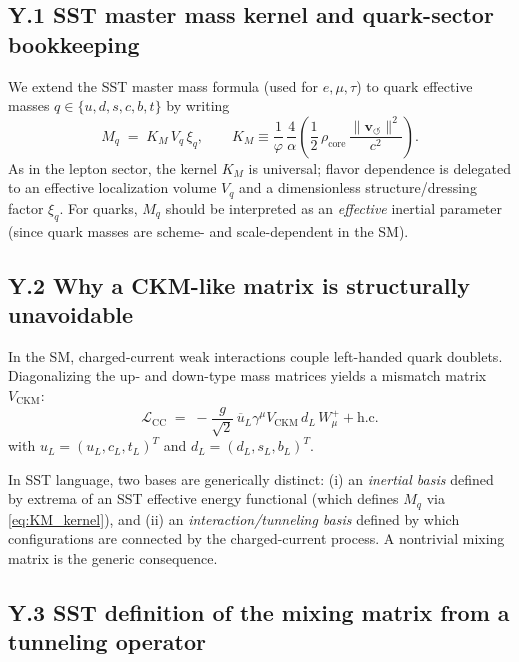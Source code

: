 \documentclass[10pt]{article}
\begin{document}
    \subsection*{Y.1 SST master mass kernel and quark-sector bookkeeping}

        We extend the SST master mass formula (used for $e,\mu,\tau$) to quark effective masses
        $q\in\{u,d,s,c,b,t\}$ by writing
        \begin{equation}
            M_q \;=\; K_M\,V_q\,\xi_q,
            \qquad
            K_M \equiv \frac{1}{\varphi}\,\frac{4}{\alpha}\left(\frac12\,\rho_{\text{core}}\,\frac{\lVert \mathbf{v}_{\!\boldsymbol{\circlearrowleft}}\rVert^2}{c^2}\right).
            \label{eq:KM_kernel}
        \end{equation}
        As in the lepton sector, the kernel $K_M$ is universal; flavor dependence is delegated to
        an effective localization volume $V_q$ and a dimensionless structure/dressing factor $\xi_q$.
        For quarks, $M_q$ should be interpreted as an \emph{effective} inertial parameter (since quark masses
        are scheme- and scale-dependent in the SM).

    \subsection*{Y.2 Why a CKM-like matrix is structurally unavoidable}

        In the SM, charged-current weak interactions couple left-handed quark doublets.
        Diagonalizing the up- and down-type mass matrices yields a mismatch matrix
        $V_{\text{CKM}}$:
        \begin{equation}
            \mathcal{L}_{\text{CC}}
            \;=\;
            -\frac{g}{\sqrt{2}}\,
            \overline{u}_{L}\gamma^\mu V_{\text{CKM}}\, d_{L}\,W^+_\mu + \text{h.c.}
            \label{eq:SM_CKM_CC}
        \end{equation}
        with $u_L=(u_L,c_L,t_L)^T$ and $d_L=(d_L,s_L,b_L)^T$.

        In SST language, two bases are generically distinct:
        (i) an \emph{inertial basis} defined by extrema of an SST effective energy functional
        (which defines $M_q$ via \eqref{eq:KM_kernel}),
        and (ii) an \emph{interaction/tunneling basis} defined by which configurations are connected by the charged-current process.
        A nontrivial mixing matrix is the generic consequence.

    \subsection*{Y.3 SST definition of the mixing matrix from a tunneling operator}
\end{document}
